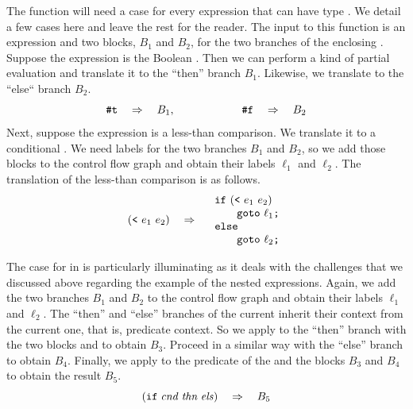 \documentclass[11pt]{book}
\begin{document}
The function  will need a case for every
expression that can have type . We detail a few cases
here and leave the rest for the reader. The input to this function is
an expression and two blocks, $B_1$ and $B_2$, for the two branches of
the enclosing . Suppose the expression is the Boolean
.  Then we can perform a kind of partial evaluation
 and translate it to the ``then'' branch
$B_1$. Likewise, we translate  to the ``else`` branch $B_2$.
\[
\texttt{\#t} \quad\Rightarrow\quad B_1,
\qquad\qquad\qquad
\texttt{\#f} \quad\Rightarrow\quad B_2
\]
Next, suppose the expression is a less-than comparison. We translate
it to a conditional . We need labels for the two branches
$B_1$ and $B_2$, so we add those blocks to the control flow graph and
obtain their labels $\ell_1$ and $\ell_2$. The translation of the
less-than comparison is as follows.
\[
(\texttt{<}~e_1~e_2) \quad\Rightarrow\quad
\begin{array}{l}
\texttt{if}~(\texttt{<}~e_1~e_2) \\
\qquad\texttt{goto}~\ell_1\texttt{;}\\
\texttt{else}\\
\qquad\texttt{goto}~\ell_2\texttt{;}
\end{array}
\]

The case for  in  is particularly
illuminating as it deals with the challenges that we discussed above
regarding the example of the nested  expressions.  Again, we
add the two branches $B_1$ and $B_2$ to the control flow graph and
obtain their labels $\ell_1$ and $\ell_2$.  The ``then'' and ``else''
branches of the current  inherit their context from the
current one, that is, predicate context. So we apply
 to the ``then'' branch with the two blocks
 and  to obtain $B_3$.  Proceed in a
similar way with the ``else'' branch to obtain $B_4$.  Finally, we
apply  to the predicate of the  and the
blocks $B_3$ and $B_4$ to obtain the result $B_5$.
\[
(\texttt{if}\; \mathit{cnd}\; \mathit{thn}\; \mathit{els})
\quad\Rightarrow\quad
B_5
\]
\end{document}
